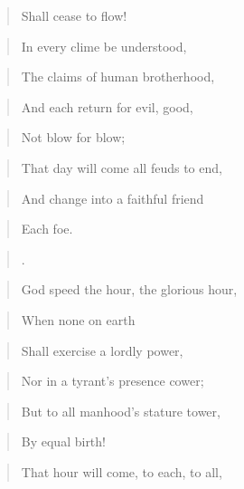 \documentclass[a4paper]{amsbook}
\begin{document}
\begin{quote}Shall cease to flow!\end{quote}

\begin{quote}In every clime be understood,\end{quote}

\begin{quote}The claims of human brotherhood,\end{quote}

\begin{quote}And each return for evil, good,\end{quote}

\begin{quote}Not blow for blow;\end{quote}

\begin{quote}That day will come all feuds to end,\end{quote}

\begin{quote}And change into a faithful friend\end{quote}

\begin{quote}Each foe.\end{quote}

\begin{quote}.\end{quote}

\begin{quote}God speed the hour, the glorious hour,\end{quote}

\begin{quote}When none on earth\end{quote}

\begin{quote}Shall exercise a lordly power,\end{quote}

\begin{quote}Nor in a tyrant's presence cower;\end{quote}

\begin{quote}But to all manhood's stature tower,\end{quote}

\begin{quote}By equal birth!\end{quote}

\begin{quote}That hour will come, to each, to all,\end{quote}
\end{document}
